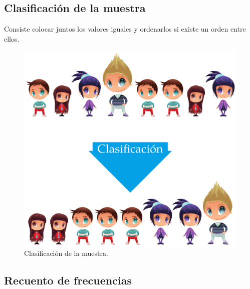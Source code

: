 \documentclass[
  a4paper,
]{scrreport}
\theoremstyle{definition}
\theoremstyle{definition}
\theoremstyle{plain}
\theoremstyle{remark}
\begin{document}
\hypertarget{clasificaciuxf3n-de-la-muestra}{%
\subsection{Clasificación de la
muestra}\label{clasificaciuxf3n-de-la-muestra}}

Consiste colocar juntos los valores iguales y ordenarlos si existe un
orden entre ellos.

\begin{figure}

{\centering \includegraphics{./img/descriptiva/clasificacion_muestra.png}

}

\caption{Clasificación de la muestra.}

\end{figure}

\hypertarget{recuento-de-frecuencias}{%
\subsection{Recuento de frecuencias}\label{recuento-de-frecuencias}}
\end{document}
